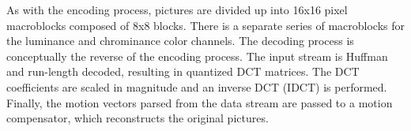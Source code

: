 As with the encoding process, pictures are divided up into 16x16 pixel
macroblocks composed of 8x8 blocks. There is a separate series of
macroblocks for the luminance and chrominance color channels.
The decoding process is conceptually the reverse of the encoding
process. The input stream is Huffman and run-length decoded, resulting
in quantized DCT matrices. The DCT coefficients are scaled in
magnitude and an inverse DCT (IDCT) is performed.
Finally, the motion vectors parsed from the data stream are passed to
a motion compensator, which reconstructs the original pictures. 
